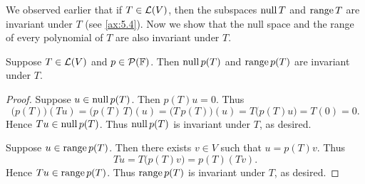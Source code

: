 We observed earlier that if $T\in\mathcal{L}(V)$, then the subspaces $\operatorname{null} T$ and
$\operatorname{range} T$ are invariant under $T$ (see \ref{ax:5.4}). Now we show that the
null space and the range of every polynomial of $T$ are also invariant under
$T$.

\begin{result}\label{ax:5.18}
Suppose $T\in\mathcal{L}(V)$ and $p\in\mathcal{P}(\mathbb{F})$. Then $\operatorname{null} p(T)$ and
$\operatorname{range} p(T)$ are invariant under $T$.
\end{result}

\begin{proof}
Suppose $u\in\operatorname{null} p(T)$. Then $p(T)u=0$. Thus
\[ \bigl(p(T)\bigr)(Tu) = \bigl(p(T)\,T\bigr)(u) = \bigl(T\,p(T)\bigr)(u)
   = T\bigl(p(T)u\bigr) = T(0) = 0. \]
Hence $Tu\in\operatorname{null} p(T)$. Thus $\operatorname{null} p(T)$ is invariant under $T$, as desired.

Suppose $u\in\operatorname{range} p(T)$. Then there exists $v\in V$ such that $u=p(T)v$.
Thus
\[ Tu = T\bigl(p(T)v\bigr) = p(T)(Tv). \]
Hence $Tu\in\operatorname{range} p(T)$. Thus $\operatorname{range} p(T)$ is invariant under $T$, as
desired.
\end{proof}

